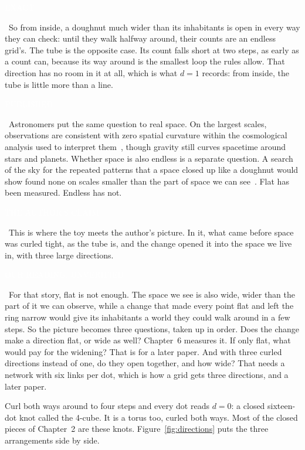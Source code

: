 \documentclass[11pt,letterpaper]{article}
\newcommand{\sub}[1]{\par\medskip{\color{ink}\large\bfseries #1}\par}
\newcommand{\tagbox}[2]{{\sffamily\scriptsize\colorbox{#1}{\textcolor{white}{\strut #2}}}}
\newcommand{\Exact}{\tagbox{kExact}{EXACT}}
\newcommand{\Pub}{\tagbox{kPub}{PUBLISHED}}
\newcommand{\Ours}{\tagbox{kOurs}{OUR READING, UNVERIFIED}}
\newcommand{\Claim}{\tagbox{kClaim}{THE AUTHOR'S CLAIM}}
\begin{document}
\Exact\ So from inside, a doughnut much wider than its inhabitants is open in every way they can
check: until they walk halfway around, their counts are an endless grid's. The tube is the opposite
case. Its count falls short at two steps, as early as a count can, because its way around is the
smallest loop the rules allow. That direction has no room in it at all, which is what $d=1$ records:
from inside, the tube is little more than a line.

\Pub\ Astronomers put the same question to real space. On the largest scales, observations are
consistent with zero spatial curvature within the cosmological analysis used to interpret
them~\cite{Planck18}, though gravity still curves spacetime around stars and planets. Whether space is
also endless is a separate question. A search of the sky for the repeated patterns that a space closed
up like a doughnut would show found none on scales smaller than the part of space we can
see~\cite{Planck15topo}. Flat has been measured. Endless has not.

\Claim\ This is where the toy meets the author's picture. In it, what came before space was curled
tight, as the tube is, and the change opened it into the space we live in, with three large
directions. \Ours\ For that story, flat is not enough. The space we see is also wide, wider than the
part of it we can observe, while a change that made every point flat and left the ring narrow would
give its inhabitants a world they could walk around in a few steps. So the picture becomes three
questions, taken up in order.
Does the change make a direction flat, or wide as well? Chapter~6 measures it. If only flat, what would
pay for the widening? That is for a later paper. And with three curled directions instead of one,
do they open together, and how wide? That needs a network with six links per dot, which is how a grid gets three directions, and a
later paper.

\sub{The knot, and the count for all three}
Curl both ways around to four steps and every dot reads $d = 0$: a closed sixteen-dot knot called the
4-cube. It is a torus too, curled both ways. Most of the closed pieces of Chapter~2 are these knots.
Figure~\ref{fig:directions} puts the three arrangements side by side.
\end{document}
